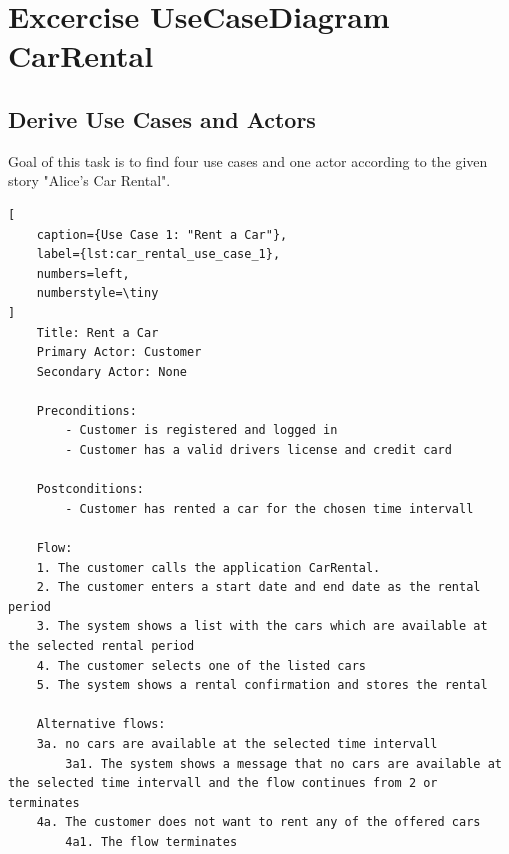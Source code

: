 \label{cha:requirements_analysis}

\section{Excercise UseCaseDiagram CarRental}

\subsection*{Derive Use Cases and Actors}
Goal of this task is to find four use cases and one actor according to the given story "Alice's Car Rental".

\begin{lstlisting}[
    caption={Use Case 1: "Rent a Car"},
    label={lst:car_rental_use_case_1},
    numbers=left,
    numberstyle=\tiny
]
    Title: Rent a Car
    Primary Actor: Customer
    Secondary Actor: None

    Preconditions:
        - Customer is registered and logged in
        - Customer has a valid drivers license and credit card

    Postconditions:
        - Customer has rented a car for the chosen time intervall

    Flow:
    1. The customer calls the application CarRental.
    2. The customer enters a start date and end date as the rental period
    3. The system shows a list with the cars which are available at the selected rental period
    4. The customer selects one of the listed cars
    5. The system shows a rental confirmation and stores the rental

    Alternative flows:
    3a. no cars are available at the selected time intervall
        3a1. The system shows a message that no cars are available at the selected time intervall and the flow continues from 2 or terminates
    4a. The customer does not want to rent any of the offered cars
        4a1. The flow terminates    
\end{lstlisting}



